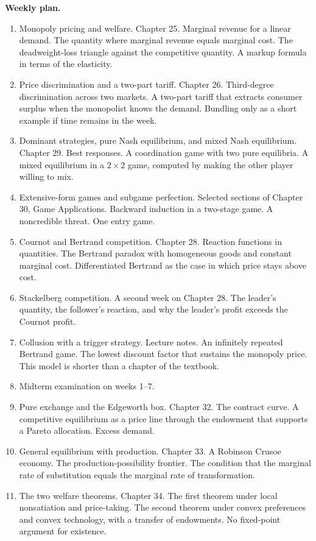 \documentclass[11pt]{article}
\begin{document}
\textbf{Weekly plan.}
\begin{enumerate}
\item Monopoly pricing and welfare. Chapter 25. Marginal revenue for a linear demand. The quantity where marginal revenue equals marginal cost. The deadweight-loss triangle against the competitive quantity. A markup formula in terms of the elasticity.
\item Price discrimination and a two-part tariff. Chapter 26. Third-degree discrimination across two markets. A two-part tariff that extracts consumer surplus when the monopolist knows the demand. Bundling only as a short example if time remains in the week.
\item Dominant strategies, pure Nash equilibrium, and mixed Nash equilibrium. Chapter 29. Best responses. A coordination game with two pure equilibria. A mixed equilibrium in a $2\times 2$ game, computed by making the other player willing to mix.
\item Extensive-form games and subgame perfection. Selected sections of Chapter 30, Game Applications. Backward induction in a two-stage game. A noncredible threat. One entry game.
\item Cournot and Bertrand competition. Chapter 28. Reaction functions in quantities. The Bertrand paradox with homogeneous goods and constant marginal cost. Differentiated Bertrand as the case in which price stays above cost.
\item Stackelberg competition. A second week on Chapter 28. The leader's quantity, the follower's reaction, and why the leader's profit exceeds the Cournot profit.
\item Collusion with a trigger strategy. Lecture notes. An infinitely repeated Bertrand game. The lowest discount factor that sustains the monopoly price. This model is shorter than a chapter of the textbook.
\item Midterm examination on weeks 1--7.
\item Pure exchange and the Edgeworth box. Chapter 32. The contract curve. A competitive equilibrium as a price line through the endowment that supports a Pareto allocation. Excess demand.
\item General equilibrium with production. Chapter 33. A Robinson Crusoe economy. The production-possibility frontier. The condition that the marginal rate of substitution equals the marginal rate of transformation.
\item The two welfare theorems. Chapter 34. The first theorem under local nonsatiation and price-taking. The second theorem under convex preferences and convex technology, with a transfer of endowments. No fixed-point argument for existence.

\end{enumerate}
\end{document}
